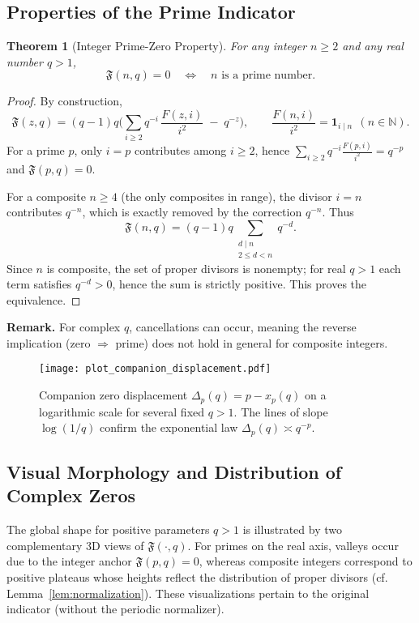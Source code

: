 \documentclass[11pt,a4paper]{amsart}
\theoremstyle{plain}
\newtheorem{theorem}{Theorem}[section]
\theoremstyle{definition}
\theoremstyle{remark}
\begin{document}
\subsection{Properties of the Prime Indicator}

\begin{theorem}[Integer Prime-Zero Property]\label{thm:integer-prime-zero}
For any integer $n \ge 2$ and any real number $q>1$,
\[\mathfrak{F}(n,q) = 0 \quad\Longleftrightarrow\quad n \text{ is a prime number}.\]
\end{theorem}
\begin{proof}
By construction,
\[
\mathfrak{F}(z,q)=(q-1)q\Big(\sum_{i\ge2} q^{-i}\,\frac{F(z,i)}{i^2}\;-\;q^{-z}\Big),\qquad
\frac{F(n,i)}{i^2}=\mathbf 1_{i\mid n}\ \ (n\in\mathbb N).
\]
For a prime $p$, only $i=p$ contributes among $i\ge2$, hence $\sum_{i\ge2} q^{-i}\tfrac{F(p,i)}{i^2}=q^{-p}$ and $\mathfrak F(p,q)=0$.

For a composite $n\ge4$ (the only composites in range), the divisor $i=n$ contributes $q^{-n}$, which is exactly removed by the correction $q^{-n}$. Thus
\[
\mathfrak F(n,q)=(q-1)q\!\!\sum_{\substack{d\mid n\\2\le d<n}}\! q^{-d}.
\]
Since $n$ is composite, the set of proper divisors is nonempty; for real $q>1$ each term satisfies $q^{-d}>0$, hence the sum is strictly positive. This proves the equivalence.
\end{proof}

\noindent\textbf{Remark.} For complex $q$, cancellations can occur, meaning the reverse implication (zero $\Rightarrow$ prime) does not hold in general for composite integers.


\begin{figure}[!htbp]
\centering
\texttt{[image: plot\_companion\_displacement.pdf]}
\caption{Companion zero displacement $\Delta_p(q)=p-x_p(q)$ on a logarithmic scale for several fixed $q>1$. The lines of slope $\log(1/q)$ confirm the exponential law $\Delta_p(q)\asymp q^{-p}$.}
\label{fig:companion_displacement}
\end{figure}

\FloatBarrier


\subsection{Visual Morphology and Distribution of Complex Zeros}\label{sec:qpos-morph-3d}
The global shape for positive parameters $q>1$ is illustrated by two complementary 3D views of $\mathfrak{F}(\cdot,q)$. For primes on the real axis, valleys occur due to the integer anchor $\mathfrak F(p,q)=0$, whereas composite integers correspond to positive plateaus whose heights reflect the distribution of proper divisors (cf. Lemma~\ref{lem:normalization}). These visualizations pertain to the original indicator (without the periodic normalizer).
\end{document}
